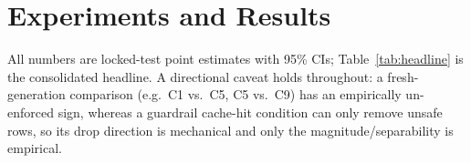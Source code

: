 \documentclass[11pt,a4paper]{article}
\newcommand{\approxs}{$\sim$}
\begin{document}
\section{Experiments and Results}

All numbers are locked-test point estimates with 95\% CIs; Table~\ref{tab:headline} is the
consolidated headline. A directional caveat holds throughout: a fresh-generation comparison
(e.g.\ C1 vs.\ C5, C5 vs.\ C9) has an empirically un-enforced sign, whereas a guardrail
cache-hit condition can only remove unsafe rows, so its drop direction is mechanical and only
the magnitude/separability is empirical.

\begin{table}[t]
\centering
\caption{Headline results: Attack Success Rate (ASR) by suite with paired benign metrics.
Bold rows are the four headline conditions (C5, C9, C21, C23). Over-refusal and helpfulness on
input-bearing guardrail rungs (marked $\dagger$) are scored on pre-block text and understate
the true benign cost, which is the guardrail FPR column (\approxs{}0.33 = one in three
borderline-benign prompts blocked before generation).}
\label{tab:headline}
\footnotesize
\setlength{\tabcolsep}{4pt}%
\noindent{}
\end{table}
\end{document}
